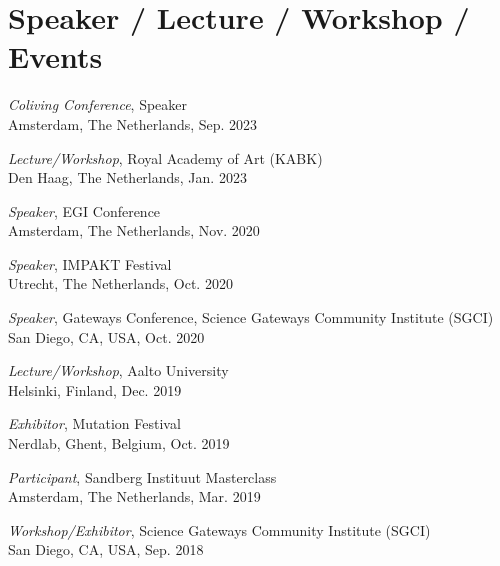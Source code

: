 \section{Speaker / Lecture / Workshop / Events}\begin{itemize}[leftmargin=0.15in, label={}]
    \small{\item{
        {\emph{Coliving Conference}, Speaker} \\
        {Amsterdam, The Netherlands, Sep. 2023} \\
    }}
    \small{\item{
        {\emph{Lecture/Workshop}, Royal Academy of Art (KABK)} \\
        {Den Haag, The Netherlands, Jan. 2023} \\
    }}
    \small{\item{
        {\emph{Speaker}, EGI Conference} \\
        {Amsterdam, The Netherlands, Nov. 2020} \\
    }}
    \small{\item{
        {\emph{Speaker}, IMPAKT Festival} \\
        {Utrecht, The Netherlands, Oct. 2020} \\
    }}
    \small{\item{
        {\emph{Speaker}, Gateways Conference, Science Gateways Community Institute (SGCI)} \\
        {San Diego, CA, USA, Oct. 2020} \\
    }}
    \small{\item{
        {\emph{Lecture/Workshop}, Aalto University} \\
        {Helsinki, Finland, Dec. 2019} \\
    }}
    \small{\item{
        {\emph{Exhibitor}, Mutation Festival} \\
        {Nerdlab, Ghent, Belgium, Oct. 2019} \\
    }}
    \small{\item{
        {\emph{Participant}, Sandberg Instituut Masterclass} \\
        {Amsterdam, The Netherlands, Mar. 2019} \\
    }}
    \small{\item{
        {\emph{Workshop/Exhibitor}, Science Gateways Community Institute (SGCI)} \\
        {San Diego, CA, USA, Sep. 2018} \\
    }}
    \small{\item{
}}
\end{itemize}
